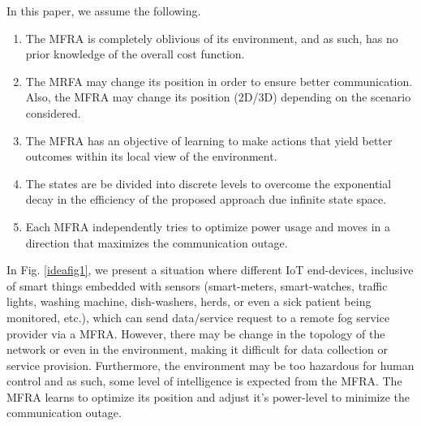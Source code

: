 \documentclass[journal]{IEEEtran}
\begin{document}
In this paper, we assume the following.
\begin{enumerate}
  \item The MFRA is completely oblivious of its environment, and as such, has no prior knowledge of the overall cost function.
  \item The MRFA may change its position in order to ensure better communication. Also, the MFRA may change its position (2D/3D) depending on the scenario considered.
  \item The MFRA has an objective of learning to make actions that yield better outcomes within its local view of the environment.
  \item The states are be divided into discrete levels to overcome the exponential decay in the efficiency of the proposed approach due infinite state space.
  \item Each MFRA independently tries to optimize power usage and moves in a direction that maximizes the communication outage.
\end{enumerate}








In Fig. \ref{ideafig1}, we present a situation where different IoT end-devices, inclusive of smart things embedded with sensors (smart-meters, smart-watches, traffic lights, washing machine, dish-washers, herds, or even a sick patient being monitored, etc.), which can send data/service request to a remote fog service provider via a MFRA. However, there may be change in the topology of the network or even in the environment, making it difficult for data collection or service provision. Furthermore, the environment may be too hazardous for human control and as such, some level of intelligence is expected from the MFRA. The MFRA learns to optimize its position and adjust it's power-level to minimize the communication outage.
\end{document}
